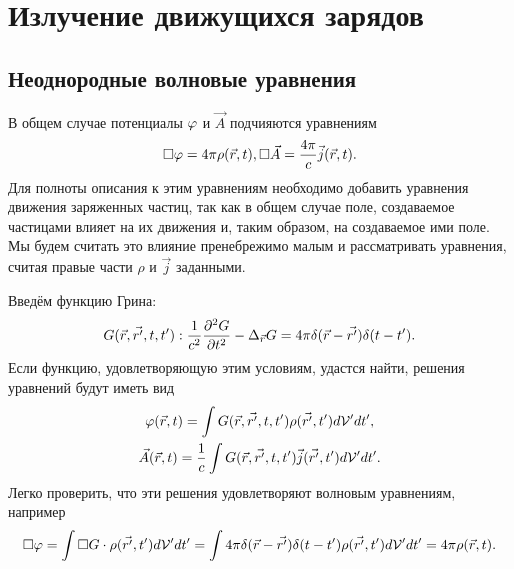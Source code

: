 \newpage
\section{Излучение движущихся зарядов}
\subsection{Неоднородные волновые уравнения}
    В общем случае потенциалы $\varphi$ и $\vec{A}$ подчияются уравнениям
    \begin{gather*}
        \Box \varphi = 4\pi\rho(\vec{r}, t),
        \Box \vec{A} = \frac{4\pi}{c}\vec{j}(\vec{r}, t).
    \end{gather*}
    Для полноты описания к этим уравнениям необходимо добавить уравнения движения заряженных частиц, так как в общем случае поле, создаваемое
    частицами влияет на их движения и, таким образом, на создаваемое ими поле. Мы будем считать это влияние пренебрежимо малым и рассматривать 
    уравнения, считая правые части $\rho$ и $\vec{j}$ заданными.

    Введём функцию Грина:
    \[
        G(\vec{r}, \vec{r'}, t, t') : \frac 1{c^2}\frac{\partial^2G}{\partial{t}^2} - \Delta_{\vec{r}}G = 4\pi\delta(\vec{r} - \vec{r'})\delta(t - t').
    \]
    Если функцию, удовлетворяющую этим условиям, удастся найти, решения уравнений будут иметь вид
    \begin{gather*}
        \varphi(\vec{r}, t) = \int G(\vec{r}, \vec{r'}, t, t') \rho(\vec{r'}, t') d\mathcal{V}'dt',\\
        \vec{A}(\vec{r}, t) = \frac 1c \int G(\vec{r}, \vec{r'}, t, t') \vec{j}(\vec{r'}, t') d\mathcal{V}'dt'.
    \end{gather*}
    Легко проверить, что эти решения удовлетворяют волновым уравнениям, например
    \[
        \Box\varphi = \int \Box G \cdot\rho(\vec{r'}, t')d\mathcal{V}'dt' = 
        \int 4\pi\delta(\vec{r} - \vec{r'})\delta(t - t') \rho(\vec{r'}, t')d\mathcal{V}'dt' = 4\pi\rho(\vec{r}, t).
    \]

